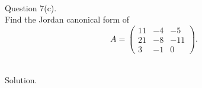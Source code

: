 \documentclass{article}
\begin{document}
\bigskip


\newpage

\hfill \break  $~\!\!$ \dotfill \medskip \\
\textnormal{Question 7(c).}\\
Find the Jordan canonical form of
\[
A = \begin{pmatrix} 11 & -4 & -5 \\ 21 & -8 & -11 \\ 3 & -1 & 0 \end{pmatrix}.
\]

\noindent\\
\textnormal{Solution.}\\
\quad\\
\end{document}
